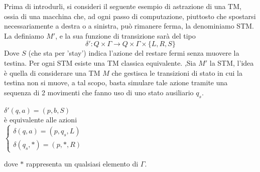 \documentclass[10pt, letterpaper]{report}
\begin{document}
Prima di introdurli, si consideri il seguente esempio di 
astrazione di una TM, ossia di una macchina che, ad ogni passo di 
computazione, piuttosto che spostarsi necessariamente a destra o 
a sinistra, può rimanere ferma, la denominiamo STM. \acc 
La definiamo $M'$, e la sua funzione di transizione sarà del tipo 
$$ \delta':Q\times\Gamma \rightarrow Q\times\Gamma\times \{L,R,S\}$$
Dove $S$ (che sta per 'stay') indica l'azione del restare fermi senza 
muovere la testina.\acc 
\prop{} Per ogni STM esiste una TM classica equivalente. \acc 
\dimo{} ,Sia $M'$ la STM, l'idea è quella di considerare una TM $M$ 
che gestisca le transizioni di stato in cui la testina 
non si muove, a tal scopo, basta simulare tale azione tramite 
una sequenza di 2 movimenti che fanno uso di uno stato ausiliario $q_s$. 
\begin{center}
    $ \delta'(q,a)=(p,b,S)$
    \\ è equivalente alle azioni \\ 
    $\begin{cases}
        \delta(q,a)=(p,q_s,L)\\ 
        \delta(q_s,*)=(p,*,R)
        
    \end{cases}$
\end{center}
dove $*$ rappresenta un qualsiasi elemento di $\Gamma$.
\end{document}
